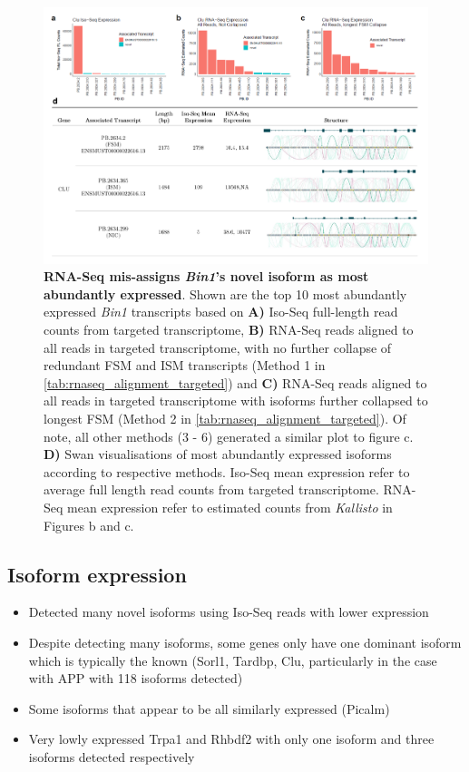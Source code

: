 \begin{landscape}
	
	\begin{figure}[htp]
		\centering
		\includegraphics[page=2,trim={0cm 0cm 0cm 0cm},clip,scale = 0.8]{Figures/ProjectDevelopment_Figures_Landscape.pdf}
		\captionsetup{width=1.2\textwidth,singlelinecheck=off}
		\caption[RNA-Seq mis-assignment of dominant isoform associated with \textit{Bin1}]%
		{\textbf{RNA-Seq mis-assigns \textit{Bin1}'s novel isoform as most abundantly expressed}. Shown are the top 10 most abundantly expressed \textit{Bin1} transcripts based on \textbf{A)} Iso-Seq full-length read counts from targeted transcriptome, \textbf{B)} RNA-Seq reads aligned to all reads in targeted transcriptome, with no further collapse of redundant FSM and ISM transcripts (Method 1 in \cref{tab:rnaseq_alignment_targeted}) and \textbf{C)} RNA-Seq reads aligned to all reads in targeted transcriptome with isoforms further collapsed to longest FSM (Method 2 in \cref{tab:rnaseq_alignment_targeted}). Of note, all other methods (3 - 6) generated a similar plot to figure c. \textbf{D)} Swan visualisations of most abundantly expressed isoforms according to respective methods. Iso-Seq mean expression refer to average full length read counts from targeted transcriptome. RNA-Seq mean expression refer to estimated counts from \textit{Kallisto} in Figures b and c. 
		}
		\label{fig:Bin1_TargetedRNAseqAlignment}
	\end{figure}
\end{landscape}
\restoregeometry




\subsection{Isoform expression}
\begin{itemize}
	\item Detected many novel isoforms using Iso-Seq reads with lower expression
	\item Despite detecting many isoforms, some genes only have one dominant isoform which is typically the known (Sorl1, Tardbp, Clu, particularly in the case with APP with 118 isoforms detected)
	\item Some isoforms that appear to be all similarly expressed (Picalm)
	\item Very lowly expressed Trpa1 and Rhbdf2 with only one isoform and three isoforms detected respectively
\end{itemize}

